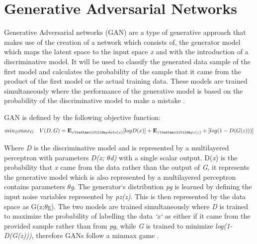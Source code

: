 \section{Generative Adversarial Networks}

Generative Adversarial networks (GAN) are a type of generative approach that makes use of the creation of a network which consists of, the generator model which maps the latent space to the input space \textit{x} and with the introduction of a discriminative model. It will be used to classify the generated data sample of the first model and calculates the probability of the sample that it came from the product of the first model or the actual training data. These models  are trained simultaneously where the performance of the generative model is based on the probability of the discriminative model to make a mistake  \citet{goodfellow:2014}. \newline

GAN is defined by the following objective function:
\begin{equation}\label{minmax}
min_{D}max_{G} \ \ \ V(D,G)= \mathbf{E}_{x\textasciitilde pdata(x)}[log D(x)] + \mathbf{E}_{z\textasciitilde pz(z)} + [log(1 - D(G(z)))]

\end{equation}

Where \textit{D} is the discriminative model and is represented by a multilayered perceptron with parameters \textit{D(x; $\theta$d)} with a single scalar output. D(\textit{x}) is the probability that \textit{x}  came from the data rather than the output of \textit{G}, it represents the generative model which is also represented by a multilayered perceptron contains parameters $\theta$\textit{g}. The generator`s distribution \textit{pg} is learned by defining the input noise variables represented by \textit{pz(z)}. This is then represented by the data space as G(z;$\theta$g). The two models are trained simultaneously where \textit{D} is trained to maximize the probability of labelling the data \textit{`x`} as either if it came from the provided sample rather than from \textit{pg}, while \textit{G} is trained to minimize \textit{log(1-D(G(z)))}, therefore GANs follow a minmax game \citet{goodfellow:2014}.

